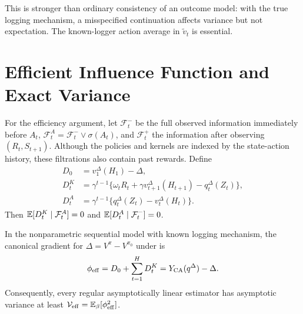 This is stronger than ordinary consistency of an outcome model: with the true logging mechanism, a misspecified continuation affects variance but not expectation. The known-logger action average in $\widetilde v_t$ is essential.

\section{Efficient Influence Function and Exact Variance}

For the efficiency argument, let $\mathcal F_t^-$ be the full observed information immediately before $A_t$, $\mathcal F_t^A=\mathcal F_t^-\vee\sigma(A_t)$, and $\mathcal F_t^+$ the information after observing $(R_t,S_{t+1})$. Although the policies and kernels are indexed by the state-action history, these filtrations also contain past rewards. Define
\begin{align*}
D_0&=v_1^\Delta(H_1)-\Delta,\\
D_t^K&=\gamma^{t-1}
\{\omega_tR_t+\gamma v_{t+1}^\Delta(H_{t+1})-q_t^\Delta(Z_t)\},\\
D_t^A&=\gamma^{t-1}\{q_t^\Delta(Z_t)-v_t^\Delta(H_t)\}.
\end{align*}
Then $\mathbb{E}[D_t^K\mid\mathcal F_t^A]=0$ and
$\mathbb{E}[D_t^A\mid\mathcal F_t^-]=0$.

\begin{theorem}
\label{thm:suppeff}
In the nonparametric sequential model with known logging mechanism, the canonical gradient for $\Delta=V^\pi-V^{\pi_0}$ under \UCC is
\begin{equation}
\phi_{\rm eff}=D_0+\sum_{t=1}^H D_t^K
=Y_{\rm CA}(q^\Delta)-\Delta.
\label{eq:eif}
\end{equation}
Consequently, every regular asymptotically linear estimator has asymptotic variance at least
$\mathcal V_{\rm eff}=\mathbb{E}_\beta[\phi_{\rm eff}^2]$.
\end{theorem}

